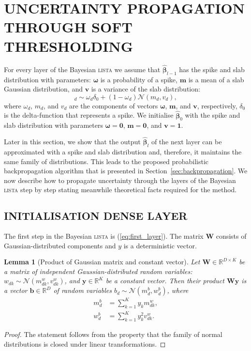 \documentclass[letterpaper]{article}
\newtheorem{lemma}{Lemma}
\begin{document}
\section{\uppercase{Uncertainty propagation through soft thresholding}}
\label{sec:fprop}
For every layer of the Bayesian \textsc{lista} we assume that $\widehat{\boldsymbol\beta}_{l-1}$ has the spike and slab distribution with parameters: $\boldsymbol\omega$ is a probability of a spike, $\mathbf{m}$ is a mean of a slab Gaussian distribution, and $\mathbf{v}$ is a variance of the slab distribution:
\begin{equation}
[\widehat{\boldsymbol\beta}_{l-1}]_d \sim \omega_d \delta_0 + (1 - \omega_d)\mathcal{N}(m_d, v_d),
\end{equation}
where $\omega_d$, $m_d$, and $v_d$ are the components of vectors $\boldsymbol\omega$, $\mathbf{m}$, and $\mathbf{v}$, respectively, $\delta_0$ is the delta-function that represents a spike. 
We initialise $\widehat{\boldsymbol\beta}_{0}$ with the spike and slab distribution with parameters $\boldsymbol\omega = \mathbf{0}$, $\mathbf{m} = \mathbf{0}$, and $\mathbf{v} = \mathbf{1}$. 

Later in this section, we show that the output $\widehat{\boldsymbol\beta}_l$ of the next layer can be approximated with a spike and slab distribution and, therefore, it maintains the same family of distributions. This leads to the proposed probabilistic backpropagation algorithm that is presented in Section~\ref{sec:backpropagation}. We now describe how to propagate uncertainty through the layers of the Bayesian \textsc{lista} step by step stating meanwhile theoretical facts required for the method.

\subsection{\uppercase{Initialisation dense layer}}
The first step in the Bayesian \textsc{lista} is (\ref{eq:first_layer}). The matrix $\mathbf{W}$ consists of Gaussian-distributed components and $y$ is a deterministic vector.

 \begin{lemma}[Product of Gaussian matrix and constant vector]
 \label{thm:matrix_const}
Let $\mathbf{W} \in \mathbb{R}^{D \times K}$ be a matrix of independent Gaussian-distributed random variables: $w_{dk} \sim \mathcal{N}(m^w_{dk}, v^w_{dk})$, and $\mathbf{y} \in \mathbb{R}^K$ be a constant vector. Then their product $\mathbf{W} \mathbf{y}$ is a vector $\mathbf{b} \in \mathbb{R}^{D}$ of random variables $b_d \sim \mathcal{N}(m^b_d, w^b_d)$, where 
\begin{subequations}
\begin{align}
m^b_d &= \sum_{k=1}^Ky_k m^w_{dk}, \\
w^b_d &= \sum_{k=1}^Ky_k^2v^w_{dk}.
 \end{align}
\end{subequations}
 
 \end{lemma}
 \begin{proof}
 	The statement follows from the property that the family of normal distributions is closed under linear transformations.
 \end{proof}
 
\end{document}
